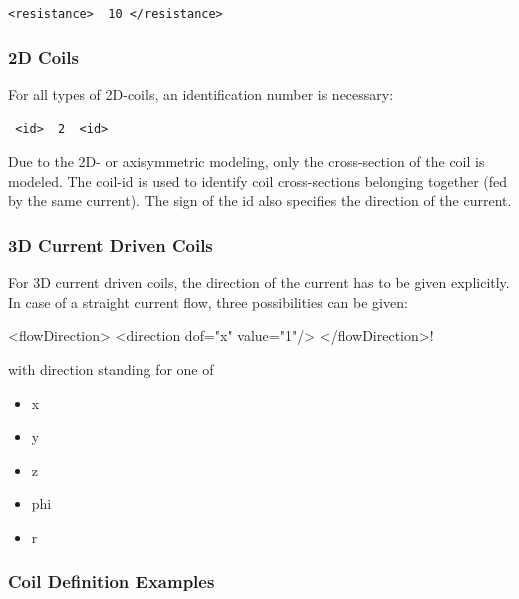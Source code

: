 \verb!<resistance>  10 </resistance>!

\subsubsection{2D Coils}
For all types of 2D-coils, an identification number is
necessary:

\verb! <id>  2  <id>!

\noindent
Due to the 2D- or axisymmetric modeling, only the cross-section of the
coil is modeled. The coil-id is
used to identify coil cross-sections belonging together (fed by the
same current). 
The sign of the id also specifies the direction of the current.

\subsubsection{3D Current Driven Coils}
For 3D current driven coils, the direction of the current has to be
given explicitly. In case of a straight current flow, three
possibilities can be given:

\begin{xmllisting}

<flowDirection>
  <direction dof="x" value="1"/>
</flowDirection>!

\end{xmllisting}

\noindent
with {\xel direction} standing for one of 
\begin{itemize}
\item x
\item y
\item z
\item phi
\item r
\end{itemize}
   
% 


\subsubsection{Coil Definition Examples}

